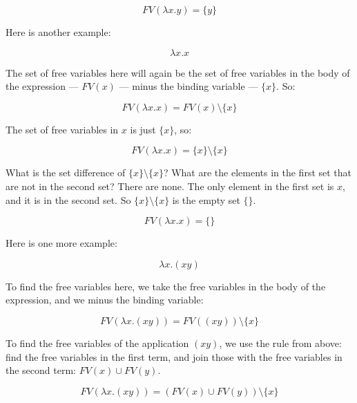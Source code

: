 \documentclass{book}
\numberwithin{equation}{chapter}
\begin{document}
\begin{equation}
FV(\lambda x.y) = \{ y \}
\end{equation}

\noindent
Here is another example:

\begin{equation}
\lambda x.x
\end{equation}

\noindent
The set of free variables here will again be the set of free variables in the body of the expression --- $FV(x)$ --- minus the binding variable --- $\{ x \}$. So:

\begin{equation}
FV(\lambda x.x) = FV(x) \setminus \{ x \}
\end{equation}

\noindent
The set of free variables in $x$ is just $\{ x \}$, so:

\begin{equation}
FV(\lambda x.x) = \{ x \} \setminus \{ x \}
\end{equation}

\noindent
What is the set difference of $\{ x \} \setminus \{ x \}$? What are the elements in the first set that are not in the second set? There are none. The only element in the first set is $x$, and it is in the second set. So $\{ x \} \setminus \{ x \}$ is the empty set $\{ \}$.

\begin{equation}
FV(\lambda x.x) = \{ \}
\end{equation}

\noindent
Here is one more example:

\begin{equation}
\lambda x.(x y)
\end{equation}

\noindent
To find the free variables here, we take the free variables in the body of the expression, and we minus the binding variable:

\begin{equation}
FV(\lambda x.(x y)) = FV((x y)) \setminus \{ x \}
\end{equation}

\noindent
To find the free variables of the application $(x y)$, we use the rule from above: find the free variables in the first term, and join those with the free variables in the second term: $FV(x) \cup FV(y)$.

\begin{equation}
FV(\lambda x.(x y)) = (FV(x) \cup FV(y)) \setminus \{ x \}
\end{equation}
\end{document}

